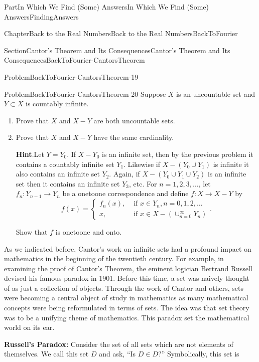 \documentclass[oneside,10pt,]{book}
\newcommand{\blocktitlefont}{\relax}
\newcommand{\terminology}[1]{\textbf{#1}}
\numberwithin{equation}{part}
\newcommand{\amp}{&}
\begin{document}
\begin{partptx}{Part}{In Which We Find (Some) Answers}{}{In Which We Find (Some) Answers}{}{}{FindingAnswers}
\begin{chapterptx}{Chapter}{Back to the Real Numbers}{}{Back to the Real Numbers}{}{}{BackToFourier}
\begin{sectionptx}{Section}{Cantor's Theorem and Its Consequences}{}{Cantor's Theorem and Its Consequences}{}{}{BackToFourier-CantorsTheorem}
\begin{problem}{Problem}{}{BackToFourier-CantorsTheorem-19}
\end{problem}
\begin{problem}{Problem}{}{BackToFourier-CantorsTheorem-20}%
Suppose \(X\) is an uncountable set and \(Y\subset X\) is countably infinite.%
\begin{enumerate}[font=\bfseries,label=(\alph*),ref=\alph*]%
\item{}Prove that \(X\) and \(X-Y\) are both uncountable sets.%
\item{}Prove that \(X\) and \(X-Y\) have the same cardinality.%
\par\smallskip%
\noindent\textbf{\blocktitlefont Hint}.\hypertarget{BackToFourier-CantorsTheorem-20-4-2}{}\quad{}Let \(Y=Y_0\).  If \(X-Y_0\) is an infinite set, then by the previous problem it contains a countably infinite set \(Y_1\).  Likewise if \(X-(Y_0\cup
Y_1)\) is infinite it also contains an infinite set \(Y_2\).  Again, if \(X-(Y_0\cup Y_1\cup Y_2)\) is an infinite set then it contains an infinite set \(Y_3\), etc.  For \(n=1, 2, 3,\ldots \), let \(f_n:Y_{n-1}\rightarrow Y_n\) be a one\textendash{}to\textendash{}one correspondence and define \(f:X\rightarrow X-Y\) by%
\begin{equation*}
f(x) =
\begin{cases}
f_n(x), \amp \text{ if }  x\in Y_n, n=0,1,2,\ldots\\
x, \amp \text{ if }  x\in X-(\cup_{n=0}^\infty Y_n ) 
\end{cases}\text{.}
\end{equation*}
%
\par
Show that \(f\) is one\textendash{}to\textendash{}one and onto.%
\end{enumerate}%
\end{problem}
As we indicated before, Cantor's  work on infinite sets had a profound impact on mathematics in the beginning of the twentieth century.  For example, in examining the proof of Cantor's Theorem, the eminent logician Bertrand Russell devised his famous paradox in 1901.  Before this time, a set was naively thought of as just a collection of objects.  Through the work of Cantor and others, sets were becoming a central object of study in mathematics as many mathematical concepts were being reformulated in terms of sets. The idea was that set theory was to be a unifying theme of mathematics.  This paradox set the mathematical world on its ear.%
\par
{} \terminology{Russell's Paradox:} Consider the set of all sets which are not elements of themselves.  We call this set \(D\) and ask, ``Is \(D\in D?\)'' Symbolically, this set is%

\end{sectionptx}
\end{chapterptx}
\end{partptx}
\end{document}
